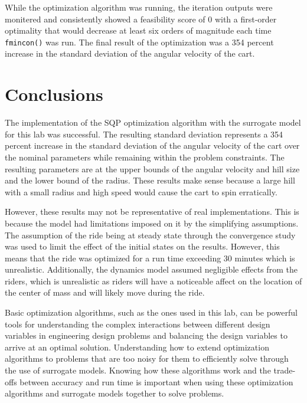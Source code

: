 \documentclass[11pt]{article}%
\begin{document}
While the optimization algorithm was running, the iteration outputs were monitered and consistently showed a feasibility score of 0 with a first-order optimality that would decrease at least six orders of magnitude each time \lstinline{fmincon()} was run. The final result of the optimization was a 354 percent increase in the standard deviation of the angular velocity of the cart. 

\medskip

\section{Conclusions}

The implementation of the SQP optimization algorithm with the surrogate model for this lab was successful. The resulting standard deviation represents a 354 percent increase in the standard deviation of the angular velocity of the cart over the nominal parameters while remaining within the problem constraints. The resulting parameters are at the upper bounds of the angular velocity and hill size and the lower bound of the radius. These results make sense because a large hill with a small radius and high speed would cause the cart to spin erratically.

However, these results may not be representative of real implementations. This is because the model had limitations imposed on it by the simplifying assumptions. The assumption of the ride being at steady state through the convergence study was used to limit the effect of the initial states on the results. However, this means that the ride was optimized for a run time exceeding 30 minutes which is unrealistic. Additionally, the dynamics model assumed negligible effects from the riders, which is unrealistic as riders will have a noticeable affect on the location of the center of mass and will likely move during the ride. 

 Basic optimization algorithms, such as the ones used in this lab, can be powerful tools for understanding the complex interactions between different design variables in engineering design problems and balancing the design variables to arrive at an optimal solution. Understanding how to extend optimization algorithms to problems that are too noisy for them to efficiently solve through the use of surrogate models. Knowing how these algorithms work and the trade-offs between accuracy and run time is important when using these optimization algorithms and surrogate models together to solve problems. 
\end{document}
